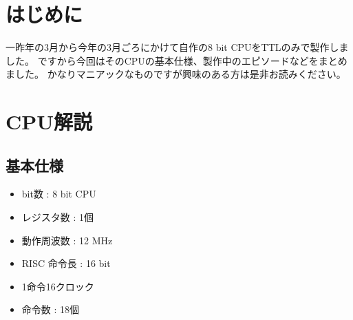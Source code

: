 \documentclass[11pt,b5paper,papersize,dvipdfmx]{jsbook}
\begin{document}


%
\section*{はじめに}
一昨年の3月から今年の3月ごろにかけて自作の8 bit CPUをTTLのみで製作しました。
ですから今回はそのCPUの基本仕様、製作中のエピソードなどをまとめました。
かなりマニアックなものですが興味のある方は是非お読みください。

%
\section{CPU解説}

%
\subsection{基本仕様}
\begin{itemize}
    \item bit数 : 8 bit CPU
    \item レジスタ数 : 1個
    \item 動作周波数 : 12 MHz
    \item RISC 命令長 : 16 bit
    \item 1命令16クロック
    \item 命令数 : 18個
\end{itemize}

%
\end{document}

